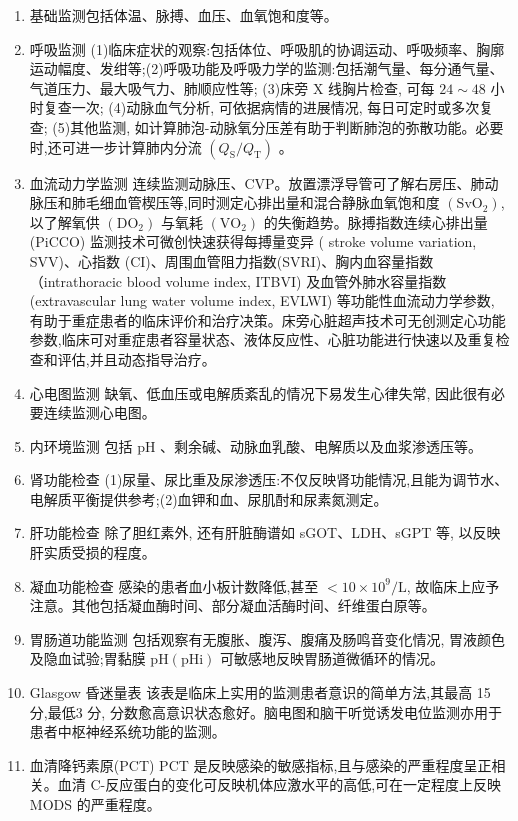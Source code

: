 \documentclass[10pt]{article}
\begin{document}
\begin{enumerate}
  \item 基础监测包括体温、脉搏、血压、血氧饱和度等。

  \item 呼吸监测 (1)临床症状的观察:包括体位、呼吸肌的协调运动、呼吸频率、胸廓运动幅度、发绀等;(2)呼吸功能及呼吸力学的监测:包括潮气量、每分通气量、气道压力、最大吸气力、肺顺应性等; (3)床旁 X 线胸片检查, 可每 $24 \sim 48$ 小时复查一次; (4)动脉血气分析, 可依据病情的进展情况, 每日可定时或多次复查; (5)其他监测, 如计算肺泡-动脉氧分压差有助于判断肺泡的弥散功能。必要时,还可进一步计算肺内分流 $\left(Q_{\mathrm{S}} / Q_{\mathrm{T}}\right)$ 。

  \item 血流动力学监测 连续监测动脉压、CVP。放置漂浮导管可了解右房压、肺动脉压和肺毛细血管楔压等,同时测定心排出量和混合静脉血氧饱和度 $\left(\mathrm{SvO}_{2}\right)$, 以了解氧供 $\left(\mathrm{DO}_{2}\right)$ 与氧耗 $\left(\mathrm{VO}_{2}\right)$ 的失衡趋势。脉搏指数连续心排出量 (PiCCO) 监测技术可微创快速获得每搏量变异 ( stroke volume variation, SVV)、心指数 (CI)、周围血管阻力指数(SVRI)、胸内血容量指数（intrathoracic blood volume index, ITBVI) 及血管外肺水容量指数 (extravascular lung water volume index, EVLWI) 等功能性血流动力学参数, 有助于重症患者的临床评价和治疗决策。床旁心脏超声技术可无创测定心功能参数,临床可对重症患者容量状态、液体反应性、心脏功能进行快速以及重复检查和评估,并且动态指导治疗。

  \item 心电图监测 缺氧、低血压或电解质紊乱的情况下易发生心律失常, 因此很有必要连续监测心电图。

  \item 内环境监测 包括 $\mathrm{pH}$ 、剩余碱、动脉血乳酸、电解质以及血浆渗透压等。

  \item 肾功能检查 (1)尿量、尿比重及尿渗透压:不仅反映肾功能情况,且能为调节水、电解质平衡提供参考;(2)血钾和血、尿肌酎和尿素氮测定。

  \item 肝功能检查 除了胆红素外, 还有肝脏酶谱如 sGOT、LDH、sGPT 等, 以反映肝实质受损的程度。

  \item 凝血功能检查 感染的患者血小板计数降低,甚至 $<10 \times 10^{9} / \mathrm{L}$, 故临床上应予注意。其他包括凝血酶时间、部分凝血活酶时间、纤维蛋白原等。

  \item 胃肠道功能监测 包括观察有无腹胀、腹泻、腹痛及肠鸣音变化情况, 胃液颜色及隐血试验;胃黏膜 $\mathrm{pH}(\mathrm{pHi})$ 可敏感地反映胃肠道微循环的情况。

  \item Glasgow 昏迷量表 该表是临床上实用的监测患者意识的简单方法,其最高 15 分,最低3 分, 分数愈高意识状态愈好。脑电图和脑干听觉诱发电位监测亦用于患者中枢神经系统功能的监测。

  \item 血清降钙素原(PCT) PCT 是反映感染的敏感指标,且与感染的严重程度呈正相关。血清 C-反应蛋白的变化可反映机体应激水平的高低,可在一定程度上反映 MODS 的严重程度。

\end{enumerate}
\end{document}
